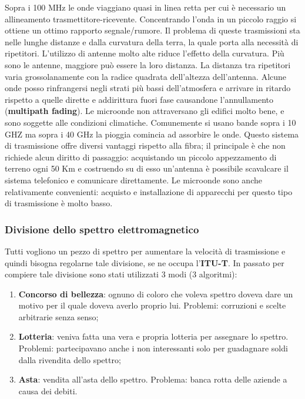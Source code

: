 Sopra i 100 MHz le onde viaggiano quasi in linea retta per cui è necessario un allineamento trasmettitore-ricevente. Concentrando l'onda in un piccolo raggio si ottiene un ottimo rapporto segnale/rumore. Il problema di queste trasmissioni sta nelle lunghe distanze e dalla curvatura della terra, la quale porta alla necessità di ripetitori. L'utilizzo di antenne molto alte riduce l'effetto della curvatura. Più sono le antenne, maggiore può essere la loro distanza. La distanza tra ripetitori varia grossolanamente con la radice quadrata dell'altezza dell'antenna. 
Alcune onde posso rinfrangersi negli strati più bassi dell'atmosfera e arrivare in ritardo rispetto a quelle dirette e addirittura fuori fase causandone l'annullamento (\textbf{multipath fading}). Le microonde non attraversano gli edifici molto bene, e sono soggette alle condizioni climatiche. Comunemente si usano bande sopra i 10 GHZ ma sopra i 40 GHz la pioggia comincia ad assorbire le onde. Questo sistema di trasmissione offre diversi vantaggi rispetto alla fibra; il principale è che non richiede alcun diritto di passaggio: acquistando un piccolo appezzamento di terreno ogni 50 Km e costruendo su di esso un'antenna è possibile scavalcare il sistema telefonico e comunicare direttamente. Le microonde sono anche relativamente convenienti: acquisto e installazione di apparecchi per questo tipo di trasmissione è molto basso.

\subsubsection*{Divisione dello spettro elettromagnetico}

Tutti vogliono un pezzo di spettro per aumentare la velocità di trasmissione e quindi bisogna regolarne tale divisione, se ne occupa l'\textbf{ITU-T}. In passato per compiere tale divisione sono stati utilizzati 3 modi (3 algoritmi):

\begin{enumerate}

\item{\textbf{Concorso di bellezza}: ognuno di coloro che voleva spettro doveva dare un motivo per il quale doveva averlo proprio lui. Problemi: corruzioni e scelte arbitrarie senza senso;}
\item{\textbf{Lotteria}: veniva fatta una vera e propria lotteria per assegnare lo spettro. Problemi: partecipavano anche i non interessanti solo per guadagnare soldi dalla rivendita dello spettro;}
\item{\textbf{Asta}: vendita all'asta dello spettro. Problema: banca rotta delle aziende a causa dei debiti.}

\end{enumerate}

